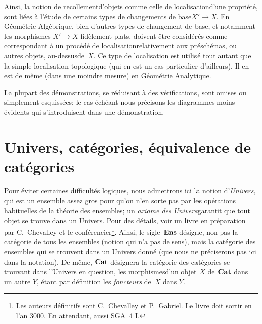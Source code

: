 Ainsi, la notion de \og recollement\fg d'objets comme celle de
\og localisation\fg d'une propri\'et\'e, sont li\'ees \`a
l'\'etude de certains types de \og changements de base\fg $X'\to X$.
En G\'eom\'etrie Alg\'ebrique, bien d'autres types de changement
de base, et notamment les morphismes $X'\to X$ fid\`element plats,
doivent \^etre consid\'er\'es comme correspondant \`a un
proc\'ed\'e de \og localisation\fg relativement aux
pr\'esch\'emas, ou autres objets, \og au-dessus\fg de~$X$. Ce type de
localisation est utilis\'e tout autant que la simple localisation
topologique (qui en est un cas particulier d'ailleurs). Il en est de
m\^eme (dans une moindre mesure) en G\'eom\'etrie Analytique.

La plupart des d\'emonstrations, se r\'eduisant \`a des
v\'erifications, sont omises ou simplement esquiss\'ees; le cas
\'ech\'eant nous pr\'ecisons les diagrammes moins \'evidents
qui s'introduisent dans une d\'emonstration.

\section{Univers, cat\'egories, \'equivalence de cat\'egories}
\label{VI.1}

Pour \'eviter certaines difficult\'es logiques, nous admettrons
ici la notion d'\emph{Univers}, qui est un ensemble \og assez gros\fg
pour qu'on n'en sorte pas par les op\'erations habituelles de la
th\'eorie des ensembles; un \og \emph{axiome des Univers}\fg garantit
que tout objet se trouve dans un Univers. Pour des d\'etails, voir
un livre en pr\'eparation par C.\, Chevalley et le conf\'erencier\footnote{Les auteurs d\'efinitifs sont C.\, Chevalley et P.\, Gabriel. Le livre doit sortir en l'an 3000. En attendant, \cf aussi SGA~4 I.}. Ainsi, le sigle~$\mathbf{Ens}$
\label{indnot:fb}d\'esigne, non pas la cat\'egorie de tous les ensembles (notion
qui n'a pas de sens), mais la cat\'egorie des ensembles qui se
trouvent dans un Univers donn\'e (que nous ne pr\'eciserons pas
ici dans la notation). De m\^eme, $\mathbf{Cat}$
\label{indnot:fc}d\'esignera la cat\'egorie des cat\'egories se trouvant dans
l'Univers en question, les \og morphismes\fg d'un objet $X$ de~$\mathbf{Cat}$
dans un autre $Y$, \'etant par d\'efinition les \emph{foncteurs}
de~$X$ dans $Y$.

